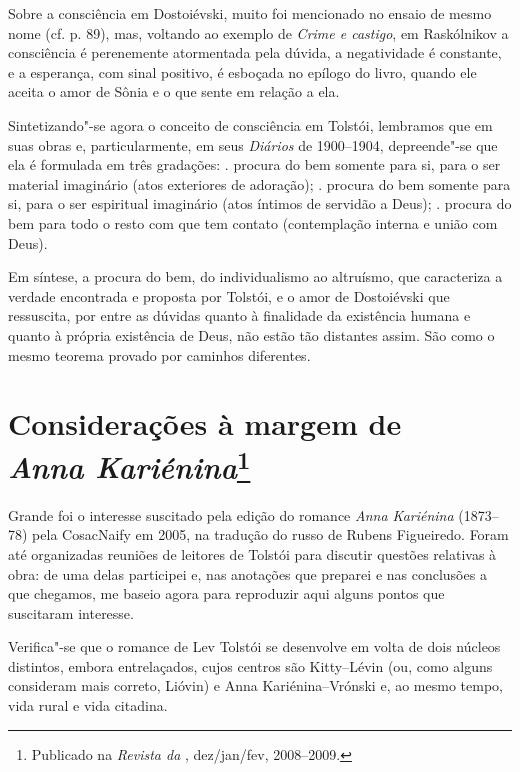 Sobre a consciência em Dostoiévski, muito foi mencionado no
ensaio de mesmo nome (cf. p. 89), mas, voltando ao
exemplo de \emph{Crime e castigo}, em Raskólnikov a consciência
é perenemente atormentada pela dúvida, a negatividade é constante,
e a esperança, com sinal positivo, é esboçada no epílogo do livro,
quando ele aceita o amor de Sônia e o que sente em relação a ela.

Sintetizando"-se agora o conceito de consciência em Tolstói, lembramos que em suas obras e, particularmente, em seus \emph{Diários} de 1900--1904, depreende"-se que ela é formulada em três gradações: . procura do bem somente para si, para o ser material imaginário (atos exteriores de adoração); . procura do bem somente para si, para o ser espiritual imaginário (atos íntimos de servidão a Deus); . procura do bem para todo o resto com que tem contato (contemplação interna e união com Deus).

Em síntese, a procura do bem, do individualismo ao altruísmo, que caracteriza a verdade encontrada e proposta por Tolstói, e o amor de Dostoiévski que ressuscita, por entre as dúvidas quanto à finalidade da existência humana e quanto à própria existência de Deus, não estão tão distantes assim. São como o mesmo teorema provado por caminhos diferentes.

\chapter{Considerações à margem de\\ \emph{Anna Kariénina}\footnote{Publicado na \emph{Revista da \protect{}}, dez/jan/fev, 2008--2009.}}
\label{anna}

Grande foi o interesse suscitado pela edição do romance \emph{Anna
Kariénina} (1873--78) pela CosacNaify em 2005, na tradução do russo de Rubens Figueiredo. Foram até organizadas
reuniões de leitores de Tolstói para discutir questões relativas à
obra: de uma delas participei e, nas anotações que preparei e nas
conclusões a que chegamos, me baseio agora para reproduzir aqui alguns
pontos que suscitaram interesse.

Verifica"-se que o romance de Lev Tolstói se desenvolve em
volta de dois núcleos distintos, embora entrelaçados, cujos centros
são Kitty--Lévin (ou, como alguns consideram mais correto, Lióvin) e Anna Kariénina--Vrónski e, ao mesmo tempo, vida
rural e vida citadina.

